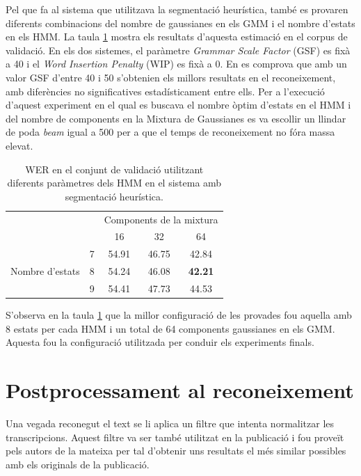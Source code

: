 Pel que fa al sistema que utilitzava la segmentació heurística, també es provaren diferents combinacions del nombre de gaussianes en els GMM i el nombre d'estats en els HMM. La taula \ref{tab:estimacio_parametres_HMM} mostra els resultats d'aquesta estimació en el corpus de validació. En els dos sistemes, el paràmetre \emph{Grammar Scale Factor} (GSF) es fixà a 40 i el \emph{Word Insertion Penalty} (WIP) es fixà a 0. En \cite{espana2011improving} es comprova que amb un valor GSF d'entre 40 i 50 s'obtenien els millors resultats en el reconeixement, amb diferències no significatives estadísticament entre ells. Per a l'execució d'aquest experiment en el qual es buscava el nombre òptim d'estats en el HMM i del nombre de components en la Mixtura de Gaussianes es va escollir un llindar de poda \emph{beam} igual a 500 per a que el temps de reconeixement no fóra massa elevat.\\

\begin{table}
\centering
\begin{tabular}{cc|c|c|c|}
\cline{3-5}
& & \multicolumn{3}{c|}{Components de la mixtura}\\
\cline{3-5}
& & 16 & 32 & 64 \\ 
\cline{1-5}
\multicolumn{1}{|c|}{\multirow{3}{*}{Nombre d'estats}} & 7 & 54.91 & 46.75 & 42.84\\
\cline{2-5}
\multicolumn{1}{|c|}{} & 8 & 54.24 & 46.08 & \textbf{42.21}\\
\cline{2-5}
\multicolumn{1}{|c|}{} & 9 & 54.41 & 47.73 & 44.53\\
\cline{1-5}
\end{tabular}
\caption{WER en el conjunt de validació utilitzant diferents paràmetres dels HMM en el sistema amb segmentació heurística.}\label{tab:estimacio_parametres_HMM}
\end{table}

S'observa en la taula \ref{tab:estimacio_parametres_HMM} que  la millor configuració de les provades fou aquella amb 8 estats per cada HMM i un total de 64 components gaussianes en els GMM. Aquesta fou la configuració utilitzada per conduir els experiments finals.

\section{Postprocessament al reconeixement}\label{sec:exper_filtre}
Una vegada reconegut el text se li aplica un filtre que intenta normalitzar les transcripcions. Aquest filtre va ser també utilitzat en la publicació \cite{espana2011improving} i fou proveït pels autors de la mateixa per tal d'obtenir uns resultats el més similar possibles amb els originals de la publicació.\\

